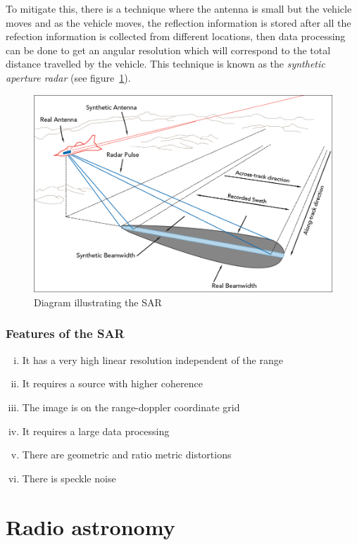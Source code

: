 To mitigate this, there is a technique where the antenna is small but the vehicle moves and as the vehicle moves, the reflection information is stored after all the refection information is collected from different locations, then data processing can be done to get an angular resolution which will correspond to the total distance travelled by the vehicle. This technique is known as the \textit{synthetic aperture radar} (see figure~\ref{fig:sar2}).
\begin{figure}[h]
\centering
\includegraphics[scale=0.3]{./graphics/sar2}
\caption{Diagram illustrating the SAR}
\label{fig:sar2}
\end{figure}

\subsubsection*{Features of the SAR}
\begin{enumerate}[(i)]
\item It has a very high linear resolution independent of the range
\item It requires a source with higher coherence
\item The image is on the range-doppler coordinate grid
\item It requires a large data processing
\item There are geometric and ratio metric distortions
\item There is speckle noise
\end{enumerate}

\section{Radio astronomy} 

